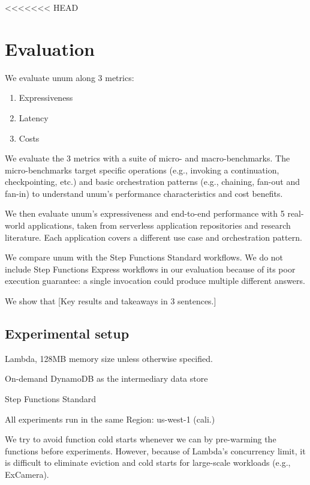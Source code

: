 <<<<<<< HEAD
\section{Evaluation}\label{sec:eval}

We evaluate unum along 3 metrics:

\begin{enumerate}
    
    \item Expressiveness

    \item Latency

    \item Costs

\end{enumerate}

We evaluate the 3 metrics with a suite of micro- and macro-benchmarks. The
micro-benchmarks target specific operations (e.g., invoking a continuation,
checkpointing, etc.) and basic orchestration patterns (e.g., chaining, fan-out
and fan-in) to understand unum's performance characteristics and cost
benefits.

We then evaluate unum's expressiveness and end-to-end performance with 5
real-world applications, taken from serverless application repositories and
research literature. Each application covers a different use case and
orchestration pattern.

We compare unum with the Step Functions Standard workflows. We do not include
Step Functions Express workflows in our evaluation because of its poor
execution guarantee: a single invocation could produce multiple different
answers.



We show that [Key results and takeaways in 3 sentences.]

\subsection{Experimental setup}

Lambda, 128MB memory size unless otherwise specified.

On-demand DynamoDB as the intermediary data store

Step Functions Standard

All experiments run in the same Region: us-west-1 (cali.)

We try to avoid function cold starts whenever we can by pre-warming the
functions before experiments. However, because of Lambda's concurrency limit,
it is difficult to eliminate eviction and cold starts for large-scale
workloads (e.g., ExCamera).

